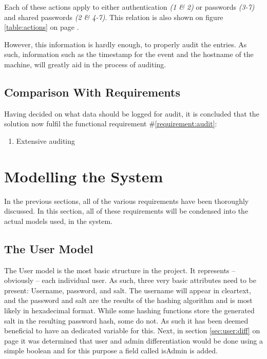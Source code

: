 		Each of these actions apply to either authentication \emph{(1 \& 2)} or passwords \emph{(3-7)} and shared passwords \emph{(2 \& 4-7)}. This relation is also shown on figure \ref{table:actions} on page \pageref{table:actions}.
		
		However, this information is hardly enough, to properly audit the entries. As such, information such as the timestamp for the event and the hostname of the machine, will greatly aid in the process of auditing. 

		\subsection{Comparison With Requirements}
			\label{requirement:fulfilled:audit}
			Having decided on what data should be logged for audit, it is concluded that the solution now fulfil the functional requirement \#\ref{requirement:audit}:
			\vspace{-3ex}\begin{enumerate}
				\setlength\itemsep{0.1em}
				\setcounter{enumi}{13-1}
				\item Extensive auditing
			\end{enumerate}

	\section{Modelling the System}
		\label{sec:modelling}
		In the previous sections, all of the various requirements have been thoroughly discussed. In this section, all of these requirements will be condensed into the actual models used, in the system. 

		\subsection{The User Model}
			The User model is the most basic structure in the project. It represents -- obviously -- each individual user. As such, three very basic attributes need to be present: Username, password, and salt. The username will appear in cleartext, and the password and salt are the results of the hashing algorithm and is most likely in hexadecimal format. While some hashing functions store the generated salt in the resulting password hash, some do not. As such it has been deemed beneficial to have an dedicated variable for this. Next, in section \ref{sec:user:diff} on page \pageref{sec:user:diff} it was determined that user and admin differentiation would be done using a simple boolean and for this purpose a field called isAdmin is added.

